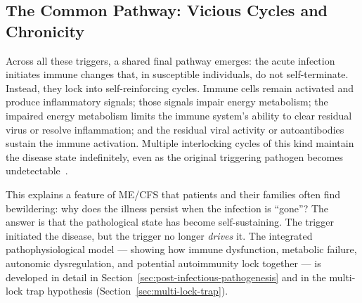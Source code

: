\subsection{The Common Pathway: Vicious Cycles and Chronicity}

Across all these triggers, a shared final pathway emerges: the acute infection initiates immune changes that, in susceptible individuals, do not self-terminate. Instead, they lock into self-reinforcing cycles. Immune cells remain activated and produce inflammatory signals; those signals impair energy metabolism; the impaired energy metabolism limits the immune system's ability to clear residual virus or resolve inflammation; and the residual viral activity or autoantibodies sustain the immune activation. Multiple interlocking cycles of this kind maintain the disease state indefinitely, even as the original triggering pathogen becomes undetectable~\cite{Rasa2018}.

This explains a feature of ME/CFS that patients and their families often find bewildering: why does the illness persist when the infection is ``gone''? The answer is that the pathological state has become self-sustaining. The trigger initiated the disease, but the trigger no longer \textit{drives} it. The integrated pathophysiological model --- showing how immune dysfunction, metabolic failure, autonomic dysregulation, and potential autoimmunity lock together --- is developed in detail in Section~\ref{sec:post-infectious-pathogenesis} and in the multi-lock trap hypothesis (Section~\ref{sec:multi-lock-trap}).

